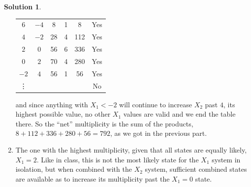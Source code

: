 \documentclass[10pt]{article}
\theoremstyle{definition}
\newtheorem{soln}{Solution}
\begin{document}
\begin{soln}
\begin{enumerate}[label=(\alph*)]
\begin{center}
\begin{tabular}{c|c|c|c|c|c}
              $6$    & $-4$        & 8          & 1          & 8                           & Yes    \\
              $4$    & $-2$        & 28         & 4          & 112                         & Yes    \\
              $2$    & $0$         & 56         & 6          & 336                         & Yes    \\
              $0$    & $2$         & 70         & 4          & 280                         & Yes    \\
              $-2$   & $4$         & 56         & 1          & 56                          & Yes    \\
              \vdots &             &            &            &                             & No
            \end{tabular}
          \end{center}
          and since anything with $X_1<-2$ will continue to increase $X_2$ past $4$, its highest possible value, no other $X_1$ values are valid and we end the table there.
          So the ``net'' multiplicity is the sum of the products, $8+112+336+280+56=792$, as we got in the previous part.
    \item The one with the highest multiplicity, given that all states are equally likely, $X_1=2$. Like in class, this is not
          the most likely state for the $X_1$ system in isolation, but when combined with the $X_2$ system, sufficient combined states are available
          as to increase its multiplicity past the $X_1=0$ state.
  \end{enumerate}
\end{soln}
\end{document}
